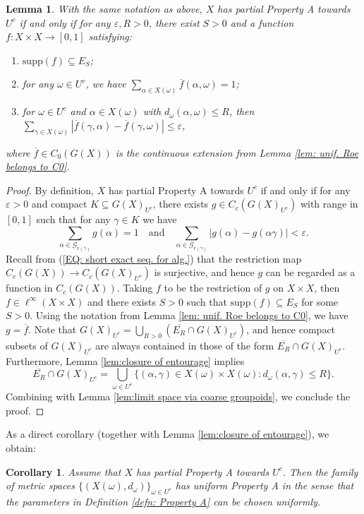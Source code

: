 \documentclass[12pt, a4paper]{amsart}
\numberwithin{equation}{section}
\newtheorem{cor}[thm]{Corollary}
\newtheorem{lem}[thm]{Lemma}
\theoremstyle{definition}
\theoremstyle{remark}
\def\G{\mathcal{G}}
\def\supp{\mathrm{supp}}
\def\r{\mathrm{r}}
\begin{document}
\begin{lem}\label{lem:char for partial A}
With the same notation as above, $X$ has partial Property A towards $U^c$ \emph{if and only if} for any $\varepsilon, R>0$, there exist $S>0$ and a function $f: X \times X \to [0,1]$ satisfying:
\begin{enumerate}
  \item $\supp(f) \subseteq E_S$;
  \item for any $\omega\in U^c$, we have $\sum_{\alpha \in X(\omega)} \overline{f}(\alpha, \omega) =1$;
  \item for $\omega\in U^c$ and $\alpha \in X(\omega)$ with $d_\omega(\alpha, \omega) \leq R$, then $\sum_{\gamma\in X(\omega)} |\overline{f}(\gamma, \alpha) - \overline{f}(\gamma, \omega)| \leq \varepsilon$,
\end{enumerate}
where $\overline{f} \in C_0(G(X))$ is the continuous extension from Lemma \ref{lem: unif. Roe belongs to C0}.
\end{lem}

\begin{proof}
By definition, $X$ has partial Property A towards $U^c$ if and only if for any $\varepsilon>0$ and compact $K \subseteq G(X)_{U^c}$, there exists $g \in C_c(G(X)_{U^c})$ with range in $[0,1]$ such that for any $\gamma \in K$ we have
\[
\sum_{\alpha \in \G_{\r(\gamma)}} g(\alpha) =1  \quad \mbox{and} \quad \sum_{\alpha \in \G_{\r(\gamma)}} |g(\alpha) - g(\alpha\gamma)| < \varepsilon.
\]
Recall from (\ref{EQ: short exact seq. for alg.}) that the restriction map $C_c(G(X)) \to C_c(G(X)_{U^c})$ is surjective, and hence $g$ can be regarded as a function in $C_c(G(X))$. Taking $f$ to be the restriction of $g$ on $X \times X$, then $f \in \ell^\infty(X \times X)$ and there exists $S>0$ such that $\supp(f) \subseteq E_S$ for some $S>0$. Using the notation from Lemma \ref{lem: unif. Roe belongs to C0}, we have $g = \overline{f}$. Note that $G(X)_{U^c} = \bigcup_{R>0} (\overline{E_R} \cap G(X)_{U^c})$, and hence compact subsets of $G(X)_{U^c}$ are always contained in those of the form $\overline{E_R} \cap G(X)_{U^c}$. Furthermore, Lemma \ref{lem:closure of entourage} implies 
\[
\overline{E_R} \cap G(X)_{U^c} = \bigcup_{\omega \in U^c} \{(\alpha, \gamma)\in X(\omega) \times X(\omega): d_\omega(\alpha, \gamma) \leq R\}.
\]
Combining with Lemma \ref{lem:limit space via coarse groupoids}, we conclude the proof.
\end{proof}


As a direct corollary (together with Lemma \ref{lem:closure of entourage}), we obtain:
\begin{cor}\label{cor:uniform A}
Assume that $X$ has partial Property A towards $U^c$. Then the family of metric spaces $\{(X(\omega), d_\omega)\}_{\omega \in U^c}$ has uniform Property A in the sense that the parameters in Definition \ref{defn: Property A} can be chosen uniformly. 
\end{cor}
\end{document}
